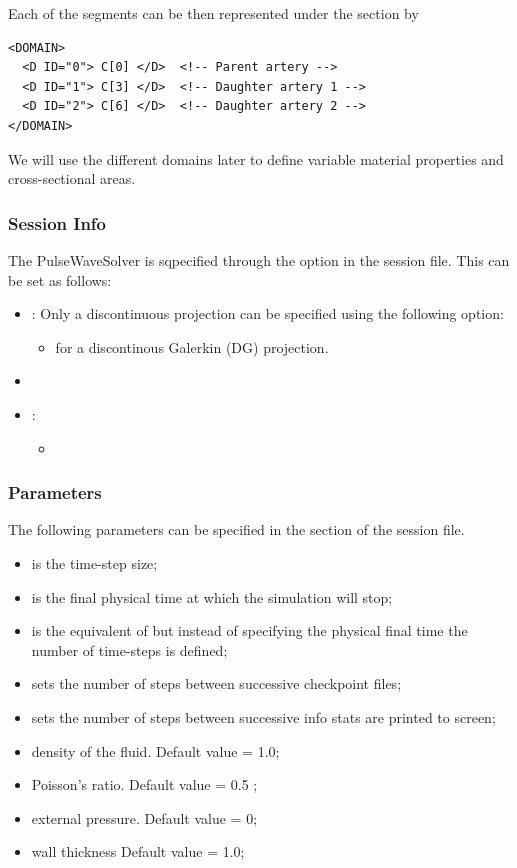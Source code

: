 Each of the segments can be then represented under the section  by
\begin{lstlisting}[style=XmlStyle]
<DOMAIN> 
  <D ID="0"> C[0] </D>	<!-- Parent artery -->
  <D ID="1"> C[3] </D>	<!-- Daughter artery 1 -->
  <D ID="2"> C[6] </D>	<!-- Daughter artery 2 -->
</DOMAIN>
\end{lstlisting}

We will use the different domains later to define variable material properties and cross-sectional areas.

\subsubsection{Session Info}
The PulseWaveSolver is sqpecified through the 
option in the session file. This can be set as follows:
\begin{itemize}
\item {}: Only a discontinuous projection can be specified
using the following option:
    \begin{itemize}
    \item {} for a discontinous Galerkin (DG) projection.
    \end{itemize}
\item {}
\item {}:
    \begin{itemize}
    \item {}
    \end{itemize}
\end{itemize}

 \subsubsection{Parameters}
The following parameters can be specified in the  section of
the session file. 
\begin{itemize}
\item {} is the time-step size;
\item {} is the final physical time at which the simulation will  stop;
\item {} is the equivalent of  but instead of specifying the 
physical final time the number of time-steps is defined;
\item {} sets the number of steps between successive checkpoint files;
\item {} sets the number of steps between successive info stats are printed 
to screen;
\item {} density of the fluid. Default value = 1.0;
\item {} Poisson's ratio. Default value = 0.5 ;
\item {} external pressure. Default value = 0;
\item {} wall thickness Default value = 1.0;
\end{itemize}

